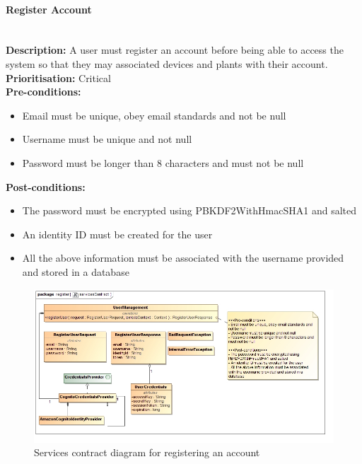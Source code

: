\documentclass{article}
\begin{document}
\paragraph{Register Account}\mbox{}\\
\textbf{Description:} A user must register an account before being able to access the system so that they may associated devices and plants with their account.\\
\textbf{Prioritisation:} Critical\\		
\textbf{Pre-conditions:}
\begin{itemize}
	\item Email must be unique, obey email standards and not be null
	\item Username must be unique and not null
	\item Password must be longer than 8 characters and must not be null
\end{itemize}
\textbf{Post-conditions:}
\begin{itemize}
	\item The password must be encrypted using PBKDF2WithHmacSHA1 and salted
	\item An identity ID must be created for the user
	\item All the above information must be associated with the username provided and stored in a database
\end{itemize}	

\begin{figure}[H]
	\includegraphics[width=\linewidth]{images/ServicesContracts/register.jpg}
	\caption{Services contract diagram for registering an account}
\end{figure}
\end{document}
